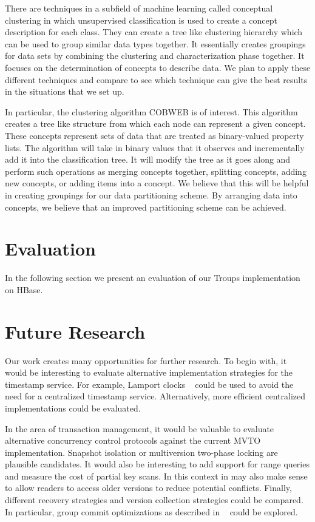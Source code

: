 \documentclass[10pt,final,journal]{IEEEtran}
\begin{document}
There are techniques in a subfield of machine learning called conceptual clustering in which unsupervised classification is used to create a concept description for each class. They can create a tree like clustering hierarchy which can be used to group similar data types together. It essentially creates groupings for data sets by combining the clustering and characterization phase together. It focuses on the determination of concepts to describe data. We plan to apply these different techniques and compare to see which technique can give the best results in the situations that we set up.

In particular, the clustering algorithm COBWEB is of interest. This algorithm creates a tree like structure from which each node can represent a given concept. These concepts represent sets of data that are treated as binary-valued property lists. The algorithm will take in binary values that it observes and incrementally add it into the classification tree. It will modify the tree as it goes along and perform such operations as merging concepts together, splitting concepts, adding new concepts, or adding items into a concept. We believe that this will be helpful in creating groupings for our data partitioning scheme. By arranging data into concepts, we believe that an improved partitioning scheme can be achieved.


\section{Evaluation}
In the following section we present an evaluation of our Troups implementation on HBase.

\section{Future Research}
Our work creates many opportunities for further research. To begin with, it would be interesting to evaluate alternative implementation strategies for the timestamp service. For example, Lamport clocks ~\cite{Lamport:1978:TCO:359545.359563} could be used to avoid the need for a centralized timestamp service. Alternatively, more efficient centralized implementations could be evaluated.

In the area of transaction management, it would be valuable to evaluate alternative concurrency control protocols against the current MVTO implementation. Snapshot isolation or multiversion two-phase locking are plausible candidates. It would also be interesting to add support for range queries and measure the cost of partial key scans. In this context in may also make sense to allow readers to access older versions to reduce potential conflicts. Finally, different recovery strategies and version collection strategies could be compared. In particular, group commit optimizations as described in ~\cite{Weikum:2001:TIS} could be explored.
\end{document}

